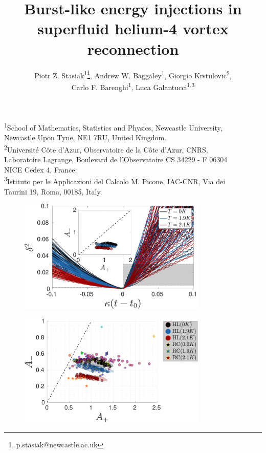 \documentclass[11pt]{article}
\title{Burst-like energy injections in superfluid helium-4 vortex reconnection}
\author{Piotr Z. Stasiak\textsuperscript{1}\footnote{p.stasiak@newcastle.ac.uk}, Andrew W. Baggaley\textsuperscript{1}, Giorgio Krstulovic\textsuperscript{2},\\ Carlo F. Barenghi\textsuperscript{1}, Luca Galantucci\textsuperscript{1,3}}
\date{}
\begin{document}
\maketitle

\vspace{-1cm}
\begin{center}
\textsuperscript{1}School of Mathematics, Statistics and Physics, Newcastle University,\\ Newcastle Upon Tyne, NE1 7RU, United Kingdom.\\
\textsuperscript{2}Universit\'{e} C\^ote d'Azur, Observatoire de la C\^ote d'Azur, CNRS,\\ Laboratoire Lagrange, Boulevard de l'Observatoire CS 34229 - F 06304\\ NICE Cedex 4, France.\\
\textsuperscript{3}Istituto per le Applicazioni del Calcolo M. Picone, IAC-CNR, Via dei \\Taurini 19, Roma, 00185, Italy.
\end{center}

\abstract{\blindtext
}

\begin{figure}
	\centering
	\includegraphics*[width=0.8\textwidth]{min-delta.pdf}
	\label{fig: min-delta}
	\caption{}
\end{figure}

\begin{figure}
	\centering
	\includegraphics*[width=0.8\textwidth]{prefactors.pdf}
	\label{fig: prefactors}
	\caption{}
\end{figure}
\end{document}
